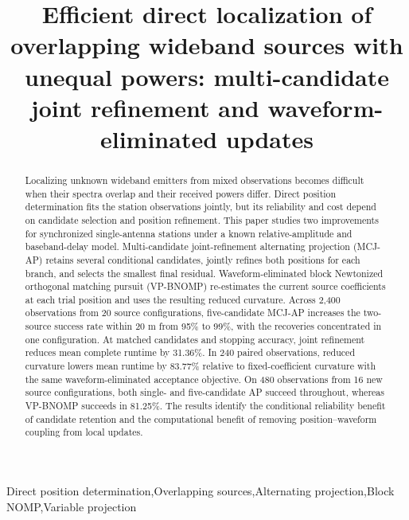 \documentclass[a4paper,fleqn,review]{cas-sc}
\begin{document}
\let\WriteBookmarks\relax
{}
\shortauthors{}
\title[mode=title]{Efficient direct localization of overlapping wideband sources with unequal powers: multi-candidate joint refinement and waveform-eliminated updates}
\begin{abstract}
Localizing unknown wideband emitters from mixed observations becomes difficult when their spectra overlap and their received powers differ. Direct position determination fits the station observations jointly, but its reliability and cost depend on candidate selection and position refinement. This paper studies two improvements for synchronized single-antenna stations under a known relative-amplitude and baseband-delay model. Multi-candidate joint-refinement alternating projection (MCJ-AP) retains several conditional candidates, jointly refines both positions for each branch, and selects the smallest final residual. Waveform-eliminated block Newtonized orthogonal matching pursuit (VP-BNOMP) re-estimates the current source coefficients at each trial position and uses the resulting reduced curvature. Across 2,400 observations from 20 source configurations, five-candidate MCJ-AP increases the two-source success rate within 20 m from 95\% to 99\%, with the recoveries concentrated in one configuration. At matched candidates and stopping accuracy, joint refinement reduces mean complete runtime by 31.36\%. In 240 paired observations, reduced curvature lowers mean runtime by 83.77\% relative to fixed-coefficient curvature with the same waveform-eliminated acceptance objective. On 480 observations from 16 new source configurations, both single- and five-candidate AP succeed throughout, whereas VP-BNOMP succeeds in 81.25\%. The results identify the conditional reliability benefit of candidate retention and the computational benefit of removing position--waveform coupling from local updates.
\end{abstract}
\begin{keywords}
Direct position determination\sep Overlapping sources\sep Alternating projection\sep Block NOMP\sep Variable projection
\end{keywords}
\maketitle

\FloatBarrier
\end{document}
